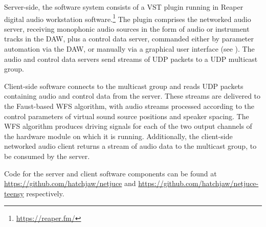 Server-side, the software system consists of a VST plugin running in Reaper
digital audio workstation software.\footnote{\url{https://reaper.fm/}}
The plugin comprises the networked audio server, receiving monophonic audio
sources in the form of audio or instrument tracks in the DAW, plus a control
data server, commanded either by parameter automation via the DAW, or manually
via a graphical user interface (see ).
The audio and control data servers send streams of UDP packets to a UDP
multicast group.

Client-side software connects to the multicast group and reads UDP packets
containing audio and control data from the server.
These streams are delivered to the Faust-based WFS algorithm, with audio
streams processed according to the control parameters of virtual sound source
positions and speaker spacing.
The WFS algorithm produces driving signals for each of the two output channels
of the hardware module on which it is running.
Additionally, the client-side networked audio client returns a stream of audio
data to the multicast group, to be consumed by the server.

Code for the server and client software components can be found at
\url{https://github.com/hatchjaw/netjuce} and
\url{https://github.com/hatchjaw/netjuce-teensy} respectively.


